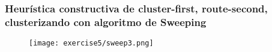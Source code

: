 \subsubsection{Heurística constructiva de cluster-first, route-second, clusterizando con algoritmo de Sweeping}


\begin{figure}[H]
	\centering
	\texttt{[image: exercise5/sweep3.png]}
\end{figure}